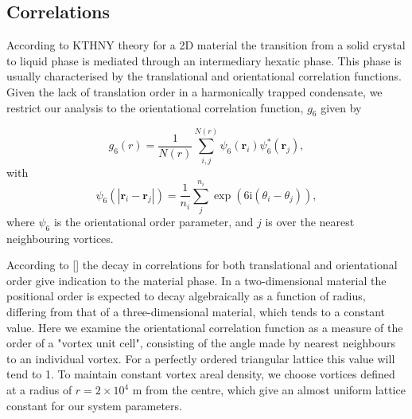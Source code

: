 \subsection{Correlations}
According to KTHNY theory for a 2D material the transition from a solid crystal to liquid phase is mediated through an intermediary hexatic
phase. This phase is usually characterised by the translational and orientational correlation functions. Given the lack of translation order
in a harmonically trapped condensate, we restrict our analysis to the orientational correlation function, $g_6$ given by
\iffalse
\begin{equation}
	\begin{aligned}
		g_6(|\mathbf{r}_i - \mathbf{r}_j|) &= \\ \frac{1}{N(r)}\displaystyle\sum_{i}^{N(r)}\displaystyle\sum_{j}^{N(r)} & \left(\frac{1}{n_j}\displaystyle\sum_{k}^{n_j}\exp(6\mathrm{i}\theta_{jk}) \right)\left(\frac{1}{n_i}\displaystyle\sum_{l}^{n_i}\exp(6\mathrm{i}\theta_{il}) \right)^{*}
	\end{aligned}
\end{equation}
\fi
\begin{equation}
	g_6(r) = \frac{1}{N(r)}\displaystyle\sum\limits_{i,j}^{N(r)}\psi_6(\mathbf{r}_i)\psi_6^{*}(\mathbf{r}_j),
\end{equation}
with
\begin{equation}
	\psi_6(|\mathbf{r}_{i} - \mathbf{r}_{j}|) = \frac{1}{n_i}\displaystyle\sum\limits_j^{n_i}\exp(6\mathrm{i}(\theta_i - \theta_j)),
\end{equation}
where $\psi_6$ is the orientational order parameter, and $j$ is over the nearest neighbouring vortices.

According to [] the decay in correlations for both translational and orientational order give indication to the material phase. In a
two-dimensional material the positional order is expected to decay algebraically as a function of radius, differing from that of a
three-dimensional material, which tends to a constant value. Here we examine the orientational correlation function as a measure of the
order of a "vortex unit cell", consisting of the angle made by nearest neighbours to an individual vortex. For a perfectly ordered
triangular lattice this value will tend to 1. To maintain constant vortex areal density, we choose vortices defined at a radius of
$r=2\times 10^4$ m from the centre, which give an almost uniform lattice constant for our system parameters.


